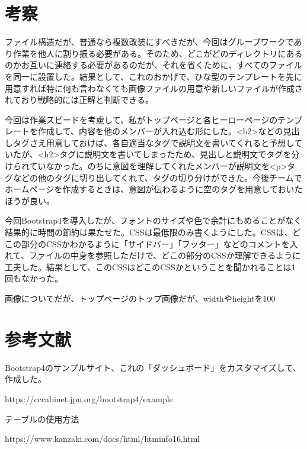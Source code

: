 \documentclass[12pt,a4j]{jarticle}
\begin{document}

\section{考察}

ファイル構造だが、普通なら複数改装にすべきだが、今回はグループワークであり作業を他人に割り振る必要がある。そのため、どこがどのディレクトリにあるのかお互いに連絡する必要があるのだが、それを省くために、すべてのファイルを同一に設置した。結果として、これのおかげで、ひな型のテンプレートを先に用意すれば特に何も言わなくても画像ファイルの用意や新しいファイルが作成されており戦略的には正解と判断できる。

今回は作業スピードを考慮して、私がトップページと各ヒーローページのテンプレートを作成して、内容を他のメンバーが入れ込む形にした。<h2>などの見出しタグさえ用意しておけば、各自適当なタグで説明文を書いてくれると予想していたが、<h2>タグに説明文を書いてしまったため、見出しと説明文でタグを分けられていなかった。のちに意図を理解してくれたメンバーが説明文を<p>タグなどの他のタグに切り出してくれて、タグの切り分けができた。今後チームでホームページを作成するときは、意図が伝わるように空のタグを用意しておいたほうが良い。

今回Bootstrap4を導入したが、フォントのサイズや色で余計にもめることがなく結果的に時間の節約は果たせた。CSSは最低限のみ書くようにした。CSSは、どこの部分のCSSかわかるように「サイドバー」「フッター」などのコメントを入れて、ファイルの中身を参照しただけで、どこの部分のCSSか理解できるように工夫した。結果として、このCSSはどこのCSSかということを聞かれることは1回もなかった。

画像についてだが、トップページのトップ画像だが、widthやheightを100%

\section{参考文献}

Bootstrap4のサンプルサイト、これの「ダッシュボード」をカスタマイズして、作成した。

https://cccabinet.jpn.org/bootstrap4/example

テーブルの使用方法

https://www.kanzaki.com/docs/html/htminfo16.html
\end{document}
